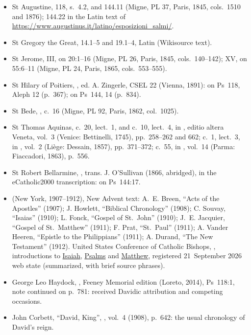 {\begin{itemize}
\item St Augustine,  118, s.~4.2, and 144.11 (Migne, PL 37, Paris, 1845, cols.~1510 and 1876); 144.22 in the Latin text of \url{https://www.augustinus.it/latino/esposizioni_salmi/}.
\item St Gregory the Great,  14.1--5 and 19.1--4, Latin (Wikisource text).
\item St Jerome,  III, on 20:1--16 (Migne, PL 26, Paris, 1845, cols.~140--142);  XV, on 55:6--11 (Migne, PL 24, Paris, 1865, cols.~553--555).
\item St Hilary of Poitiers, , ed. A. Zingerle, CSEL 22 (Vienna, 1891): on Ps~118, Aleph 12 (p.~367); on Ps~144, 14 (p.~834).
\item St Bede, , c.~16 (Migne, PL 92, Paris, 1862, col.~1025).
\item St Thomas Aquinas,  c.~20, lect.~1, and  c.~10, lect.~4, in , editio altera Veneta, vol.~3 (Venice: Bettinelli, 1745), pp.~258--262 and 662;  c.~1, lect.~3, in , vol.~2 (Li\`ege: Dessain, 1857), pp.~371--372;  c.~55, in , vol.~14 (Parma: Fiaccadori, 1863), p.~556.
\item St Robert Bellarmine, , trans. J. O'Sullivan (1866, abridged), in the eCatholic2000 transcription: on Ps~144:17.
\item {} (New York, 1907--1912), New Advent text: A.~E. Breen, ``Acts of the Apostles'' (1907); J. Howlett, ``Biblical Chronology'' (1908); C. Souvay, ``Isaias'' (1910); L. Fonck, ``Gospel of St.~John'' (1910); J.~E. Jacquier, ``Gospel of St.~Matthew'' (1911); F. Prat, ``St.~Paul'' (1911); A. Vander Heeren, ``Epistle to the Philippians'' (1911); A. Durand, ``The New Testament'' (1912). United States Conference of Catholic Bishops, , introductions to \href{https://bible.usccb.org/bible/isaiah/0}{Isaiah}, \href{https://bible.usccb.org/bible/psalms/0}{Psalms} and \href{https://bible.usccb.org/bible/matthew/0}{Matthew}, registered 21~September 2026 web state (summarized, with brief source phrases).
\item George Leo Haydock, , Feeney Memorial edition (Loreto, 2014), Ps~118:1, note continued on p.~781: received Davidic attribution and competing occasions.
\item John Corbett, ``David, King'', , vol.~4 (1908), p.~642: the usual chronology of David's reign.
\end{itemize}
\par}
